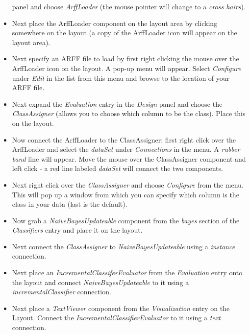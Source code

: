 \begin{itemize}
  panel and choose \textit{ArffLoader} (the mouse pointer will
          change to a \textit{cross hairs}).

	\item Next place the ArffLoader component on the layout area by clicking
	somewhere on the layout (a copy of the ArffLoader icon will appear on
	the layout area).

	\item Next specify an ARFF file to load by first right clicking the mouse
	over the ArffLoader icon on the layout. A pop-up menu will
	appear. Select \textit{Configure} under \textit{Edit} in the list from this menu and
	browse to the location of your ARFF file.

	\item Next expand the \textit{Evaluation} entry in the
          \textit{Design} panel and choose the \textit{ClassAssigner}
          (allows you to choose which column to be the class). Place
          this on the layout.

	\item Now connect the ArffLoader to the ClassAssigner: first right click
	over the ArffLoader and select the \textit{dataSet} under \textit{Connections} in
	the menu. A \textit{rubber band} line will appear. Move the mouse over the
	ClassAssigner component and left click - a red line labeled \textit{dataSet}
	will connect the two components.

	\item Next right click over the \textit{ClassAssigner} and choose \textit{Configure} from
	the menu. This will pop up a window from which you can specify which
	column is the class in your data (last is the default).

        \item Now grab a \textit{NaiveBayesUpdateable} component from the \textit{bayes}
        section of the \textit{Classifiers} entry and place it on the layout.

        \item Next connect the \textit{ClassAssigner} to \textit{NaiveBayesUpdateable}
        using a \textit{instance} connection.

        \item Next place an \textit{IncrementalClassiferEvaluator} from the \textit{Evaluation}
        entry onto the layout and connect \textit{NaiveBayesUpdateable} to it using a
        \textit{incrementalClassifier} connection.

        \item Next place a \textit{TextViewer} component from the \textit{Visualization}
        entry on the Layout. Connect the \textit{IncrementalClassifierEvaluator} to
        it using a \textit{text} connection.


\end{itemize}
